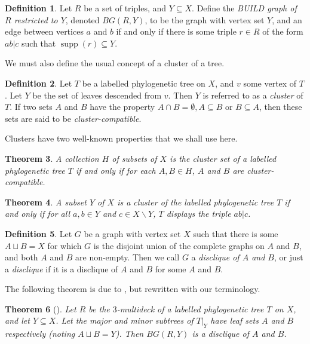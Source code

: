 \documentclass[12pt]{article}
\newtheorem{Theorem}{Theorem}[section]
\theoremstyle{definition}
\newtheorem{Definition}[Theorem]{Definition}
\DeclareMathOperator{\supp}{supp}
\begin{document}
\begin{Definition}
    Let $R$ be a set of triples, and $Y \subseteq X$. Define the \emph{BUILD graph of $R$ restricted to $Y$}, denoted $BG(R,Y)$, to be the graph with vertex set $Y$, and an edge between vertices $a$ and $b$ if and only if there is some triple $r \in R$ of the form $ab|c$ such that $\supp(r) \subseteq Y$.
\end{Definition}

We must also define the usual concept of a cluster of a tree.

\begin{Definition}
    Let $T$ be a labelled phylogenetic tree on $X$, and $v$ some vertex of $T$. Let $Y$ be the set of leaves descended from $v$. Then $Y$ is referred to as a \emph{cluster} of $T$. If two sets $A$ and $B$ have the property $A \cap B = \emptyset, A \subseteq B$ or $B \subseteq A$, then these sets are said to be \emph{cluster-compatible}.
\end{Definition}

Clusters have two well-known properties that we shall use here.

\begin{Theorem}\label{t:compatible.clusters}
    A collection $H$ of subsets of $X$ is the cluster set of a labelled phylogenetic tree $T$ if and only if for each $A,B \in H$, $A$ and $B$ are cluster-compatible.
\end{Theorem}

\begin{Theorem}
    A subset $Y$ of $X$ is a cluster of the labelled phylogenetic tree $T$ if and only if for all $a,b \in Y$ and $c \in X \backslash Y$, $T$ displays the triple $ab|c$.
\end{Theorem}


\begin{Definition}
    Let $G$ be a graph with vertex set $X$ such that there is some $A \sqcup B = X$ for which $G$ is the disjoint union of the complete graphs on $A$ and $B$, and both $A$ and $B$ are non-empty. Then we call $G$ a \emph{disclique of $A$ and $B$}, or just a \emph{disclique} if it is a disclique of $A$ and $B$ for some $A$ and $B$. 
\end{Definition}

The following theorem is due to \cite{aho1981inferring}, but rewritten with our terminology.

\begin{Theorem}[\cite{aho1981inferring}]\label{t:buildistwocliques}
Let $R$ be the $3$-multideck of a labelled phylogenetic tree $T$ on $X$, and let $Y \subseteq X$. Let the major and minor subtrees of $T|_Y$ have leaf sets $A$ and $B$ respectively (noting $A \sqcup B = Y$).  Then $BG(R,Y)$ is a disclique of $A$ and $B$.
\end{Theorem}
\end{document}
